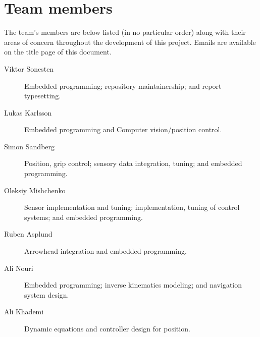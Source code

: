 \section{Team members}
The team's members are below listed (in no particular order) along with their areas of concern throughout the development of this project.
Emails are available on the title page of this document.

\begin{description}
    \item[Viktor Sonesten]
    Embedded programming;
    repository maintainership; and
    report typesetting.

    \item[Lukas Karlsson]
    Embedded programming and
    Computer vision/position control.

    \item[Simon Sandberg]
    Position, grip control;
    sensory data integration, tuning; and
    embedded programming.

    \item[Oleksiy Mishchenko]
    Sensor implementation and tuning;
    implementation, tuning of control systems; and
    embedded programming.

    \item[Ruben Asplund]
    Arrowhead integration and embedded programming.

    \item[Ali Nouri]
    Embedded programming;
    inverse kinematics modeling; and
    navigation system design.

    \item[Ali Khademi]
    Dynamic equations and controller design for position.
\end{description}

